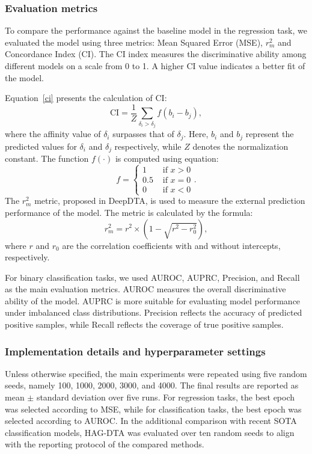 \documentclass[pdflatex,sn-mathphys-num]{sn-jnl}%
\theoremstyle{thmstyleone}%
\theoremstyle{thmstyletwo}%
\theoremstyle{thmstylethree}%
\begin{document}
\subsubsection{Evaluation metrics}

To compare the performance against the baseline model in the regression task, we evaluated the model using three metrics: Mean Squared Error (MSE), $r_m^2$ and Concordance Index (CI)\cite{gonen2005concordance}. The CI index measures the discriminative ability among different models on a scale from 0 to 1. A higher CI value indicates a better fit of the model.

Equation~\ref{ci} presents the calculation of CI:
\begin{equation}
\mathrm{CI}=\frac{1}{Z}\sum_{\delta_i>\delta_j} f(b_i-b_j),
\label{ci}
\end{equation}
where the affinity value of $\delta_i$ surpasses that of $\delta_j$. Here, $b_i$ and $b_j$ represent the predicted values for $\delta_i$ and $\delta_j$ respectively, while $Z$ denotes the normalization constant. The function $f(\cdot)$ is computed using equation:
$$
f = \begin{cases}
  1 & \text{ if } x>0 \\
  0.5& \text{ if } x=0 \\
  0& \text{ if } x<0
\end{cases}.
$$
The $r_m^2$ metric, proposed in DeepDTA\cite{ozturk2018deepdta}, is used to measure the external prediction performance of the model. The metric is calculated by the formula:
$$
r_m^2=r^2\times(1-\sqrt{r^2-r_0^2})
,$$
where $r$ and $r_0$ are the correlation coefficients with and without intercepts, respectively.


For binary classification tasks, we used AUROC, AUPRC, Precision, and Recall as the main evaluation metrics. AUROC measures the overall discriminative ability of the model. AUPRC is more suitable for evaluating model performance under imbalanced class distributions. Precision reflects the accuracy of predicted positive samples, while Recall reflects the coverage of true positive samples.


\subsubsection{Implementation details and hyperparameter settings}

Unless otherwise specified, the main experiments were repeated using five random seeds, namely 100, 1000, 2000, 3000, and 4000. The final results are reported as mean $\pm$ standard deviation over five runs. For regression tasks, the best epoch was selected according to MSE, while for classification tasks, the best epoch was selected according to AUROC. In the additional comparison with recent SOTA classification models, HAG-DTA was evaluated over ten random seeds to align with the reporting protocol of the compared methods.
\end{document}
